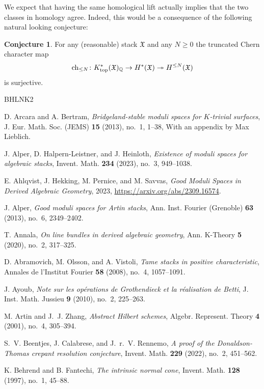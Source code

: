 \documentclass[12pt]{amsart}
\theoremstyle{definition}
\newtheorem{conjecture}[definition]{Conjecture}
\newcommand{\BQ}{{\mathbb{Q}}}
\newcommand{\1}{\mathbf 1}
\newcommand{\FX}{{\mathfrak{X}}}
\newcommand{\ch}{\mathrm{ch}}
\begin{document}
We expect that having the same homological lift actually implies that the two classes in homology agree. Indeed, this would be a consequence of the following natural looking conjecture:

\begin{conjecture}
For any (reasonable) stack $\FX$ and any $N\geq 0$ the truncated Chern character map
\[\ch_{\leq N}\colon K^\ast_{\textup{top}}(\FX)_\BQ\to H^\ast(\FX)\twoheadrightarrow H^{\leq N}(\FX)\]
is surjective.
\end{conjecture}
\begin{thebibliography}{BHLNK2}

D. Arcara and A. Bertram, \emph{Bridgeland-stable moduli spaces for {$K$}-trivial surfaces}, J. Eur. Math. Soc. (JEMS) \textbf{15} (2013), no.~1, 1--38, With an appendix by Max Lieblich.

J. Alper, D. Halpern-Leistner, and J. Heinloth, \emph{Existence of moduli spaces for algebraic stacks}, Invent. Math. \textbf{234} (2023), no.~3, 949--1038.

E. Ahlqvist, J. Hekking, M. Pernice, and M. Savvas, \emph{Good Moduli Spaces in Derived Algebraic Geometry}, 2023, \url{https://arxiv.org/abs/2309.16574}.

J. Alper, \emph{Good moduli spaces for {A}rtin stacks}, Ann. Inst. Fourier (Grenoble) \textbf{63} (2013), no.~6, 2349--2402.

T. Annala, \emph{On line bundles in derived algebraic geometry}, Ann. K-Theory \textbf{5} (2020), no.~2, 317--325.

D. Abramovich, M. Olsson, and A. Vistoli, \emph{Tame stacks in positive characteristic}, Annales de l'Institut Fourier \textbf{58} (2008), no.~4, 1057--1091.

J. Ayoub, \emph{Note sur les op\'erations de {G}rothendieck et la r\'ealisation de {B}etti}, J. Inst. Math. Jussieu \textbf{9} (2010), no.~2, 225--263.

M. Artin and J.~J. Zhang, \emph{Abstract {H}ilbert schemes}, Algebr. Represent. Theory \textbf{4} (2001), no.~4, 305--394.

S.~V. Beentjes, J. Calabrese, and J.~r.~V. Rennemo, \emph{A proof of the {D}onaldson-{T}homas crepant resolution conjecture}, Invent. Math. \textbf{229} (2022), no.~2, 451--562.

K. Behrend and B. Fantechi, \emph{The intrinsic normal cone}, Invent. Math. \textbf{128} (1997), no.~1, 45--88.




\end{thebibliography}
\end{document}
